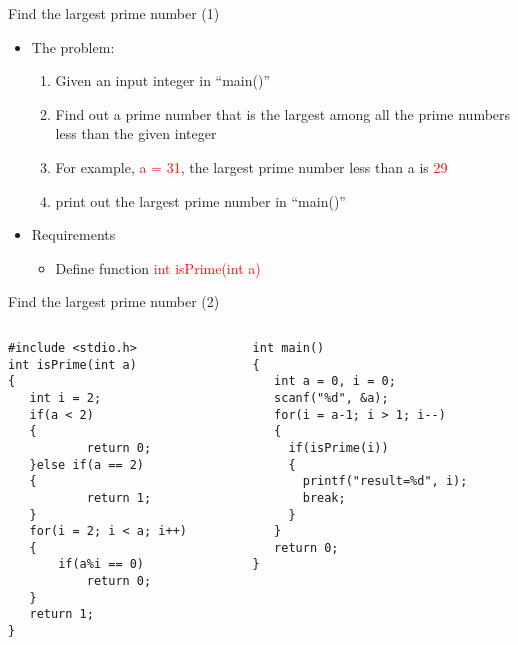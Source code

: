 \begin{frame}{Find the largest prime number (1)}

\begin{itemize}
	\item {The problem:}
	\begin{enumerate}
		\item {Given an input integer in ``main()''}
		\item {Find out a prime number that is the largest among all the prime numbers less than the given integer}
		\item {For example, \textcolor{red}{a = 31}, the largest prime number less than a is \textcolor{red}{29}}
		\item {print out the largest prime number in ``main()''}
	\end{enumerate}
\end{itemize}
\begin{itemize}
	\item {Requirements}
	\begin{itemize}
		\item {Define function \textcolor{red}{int isPrime(int a)}}
	\end{itemize}
\end{itemize}

\end{frame}

\ifx\answer\undefined
\begin{frame}[fragile]{Find the largest prime number (2)}
\begin{columns}
\begin{column}{0.44\linewidth}
\begin{lstlisting}[xleftmargin=0.03\linewidth]
#include <stdio.h>
int isPrime(int a)
{
   int i = 2;
   if(a < 2)
   {
           return 0;
   }else if(a == 2)
   {
           return 1;
   }
   for(i = 2; i < a; i++)
   {
       if(a%i == 0)
           return 0;
   }
   return 1;
}
\end{lstlisting}
\end{column}
\begin{column}{0.53\linewidth}
\begin{lstlisting}[firstnumber=15, linewidth=0.96\linewidth, xleftmargin=0.04\linewidth]
int main()
{
   int a = 0, i = 0;
   scanf("%d", &a);
   for(i = a-1; i > 1; i--)
   {
     if(isPrime(i))
     {
       printf("result=%d", i);
       break;
     }
   }
   return 0;
}
\end{lstlisting}
\end{column}
\end{columns}

\end{frame}
\fi

